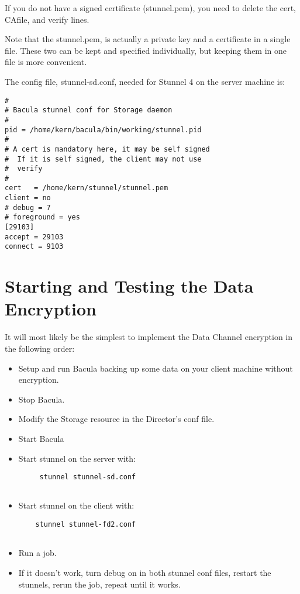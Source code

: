 If you do not have a signed certificate (stunnel.pem), you need to delete the
cert, CAfile, and verify lines. 

Note that the stunnel.pem, is actually a private key and a certificate in a
single file. These two can be kept and specified individually, but keeping
them in one file is more convenient. 

The config file, stunnel-sd.conf, needed for Stunnel 4 on the server machine
is: 

\footnotesize
\begin{verbatim}
#
# Bacula stunnel conf for Storage daemon
#
pid = /home/kern/bacula/bin/working/stunnel.pid
#
# A cert is mandatory here, it may be self signed
#  If it is self signed, the client may not use
#  verify
#
cert   = /home/kern/stunnel/stunnel.pem
client = no
# debug = 7
# foreground = yes
[29103]
accept = 29103
connect = 9103
\end{verbatim}
\normalsize

\section{Starting and Testing the Data Encryption}

It will most likely be the simplest to implement the Data Channel encryption
in the following order: 

\begin{itemize}
\item Setup and run Bacula backing up some data on your  client machine
   without encryption.  
\item Stop Bacula.  
\item Modify the Storage resource in the Director's conf  file.  
\item Start Bacula  
\item Start stunnel on the server with:  

   \footnotesize
\begin{verbatim}
     stunnel stunnel-sd.conf
  
\end{verbatim}
\normalsize

\item Start stunnel on the client with:  

   \footnotesize
\begin{verbatim}
    stunnel stunnel-fd2.conf
  
\end{verbatim}
\normalsize

\item Run a job.  
\item If it doesn't work, turn debug on in both stunnel conf files,  restart
   the stunnels, rerun the job, repeat until it works. 
   \end{itemize}

